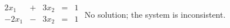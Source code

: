 {$\begin{array}{KQJQQ}
2x_1&+&3x_2&=&1\\
-2x_1&-&3x_2&=&1\\
\end{array}$}
{No solution; the system is inconsistent.}
